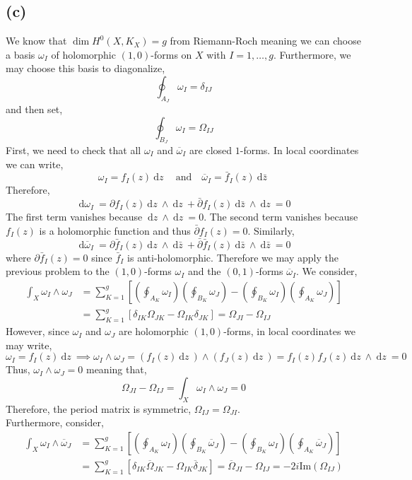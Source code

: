 \documentclass[12pt]{extarticle}
\renewcommand{\Im}[1]{\mathrm{Im}(#1)}
\renewcommand{\d}[1]{\: \mathrm{d}#1 \:}
\theoremstyle{definition}
\begin{document}
\subsection*{(c)}

We know that $\dim{H^0(X, K_X)} = g$ from Riemann-Roch meaning we can choose a basis $\omega_I$ of holomorphic $(1,0)$-forms on $X$ with $I = 1, \dots, g$. Furthermore, we may choose this basis to diagonalize,
\[ \oint_{A_J} \omega_I = \delta_{IJ} \] 
and then set,
\[ \oint_{B_J} \omega_I = \Omega_{IJ} \]
First, we need to check that all $\omega_I$ and $\overline{\omega}_I$ are closed $1$-forms. In local coordinates we can write,
\[ \omega_I = f_I(z) \d{z} \quad \text{and} \quad \overline{\omega}_I = \bar{f}_I(z) \d{\bar{z}} \]
Therefore,
\[ \d{\omega_I} = \partial f_I(z) \d{z} \wedge \d{z} + \bar{\partial} f_I(z) \d{\bar{z}} \wedge \d{z} = 0 \]
The first term vanishes because $\d{z} \wedge \d{z} = 0$. The second term vanishes because $f_I(z)$ is a holomorphic function and thus $\bar{\partial} f_I(z) = 0$.
Similarly,
\[ \d{\overline{\omega}_I} = \partial \bar{f}_I(z) \d{z} \wedge \d{\bar{z}} + \bar{\partial} \bar{f}_I(z) \d{\bar{z}} \wedge \d{\bar{z}} = 0 \]
where $\partial \bar{f}_I(z) = 0$ since $\bar{f}_I$ is anti-holomorphic. 
Therefore we may apply the previous problem to the $(1,0)$-forms $\omega_I$ and the $(0,1)$-forms $\overline{\omega}_I$. We consider,
\begin{align*}
\int_X \omega_I \wedge \omega_J & = \sum_{K = 1}^g \left[ \left( \oint_{A_K} \omega_I \right) \left(  \oint_{B_K}  \omega_J \right) -  \left( \oint_{B_K} \omega_I \right) \left( \oint_{A_K} \omega_J \right)  \right] 
\\
& = \sum_{K = 1}^g \left[ \delta_{IK} \Omega_{JK} - \Omega_{IK} \delta_{JK} \right] = \Omega_{JI} - \Omega_{IJ}
\end{align*}
However, since $\omega_I$ and $\omega_J$ are holomorphic $(1,0)$-forms, in local coordinates we may write,
\[ \omega_I = f_I(z) \d{z} \implies \omega_I \wedge \omega_J = (f_I(z) \d{z}) \wedge (f_J(z) \d{z}) = f_I(z) f_J(z) \d{z} \wedge \d{z} = 0 \]
Thus, $\omega_I \wedge \omega_J = 0$ meaning that,
\[ \Omega_{JI} - \Omega_{IJ} = \int_X \omega_I \wedge \omega_J = 0 \]
Therefore, the period matrix is symmetric, $\Omega_{IJ} = \Omega_{JI}$. 
\bigskip\\
Furthermore, consider,
\begin{align*}
\int_X \omega_I \wedge \overline{\omega}_J & = \sum_{K = 1}^g \left[ \left( \oint_{A_K} \omega_I \right) \left(  \oint_{B_K}  \overline{\omega}_J \right) -  \left( \oint_{B_K} \omega_I \right) \left( \oint_{A_K} \overline{\omega}_J \right)  \right] 
\\
& = \sum_{K = 1}^g \left[ \delta_{IK} \overline{\Omega}_{JK} - \Omega_{IK} \overline{\delta}_{JK} \right] = \overline{\Omega}_{JI} - \Omega_{IJ} = - 2 i \Im{\Omega_{IJ}}
\end{align*}
\end{document}
